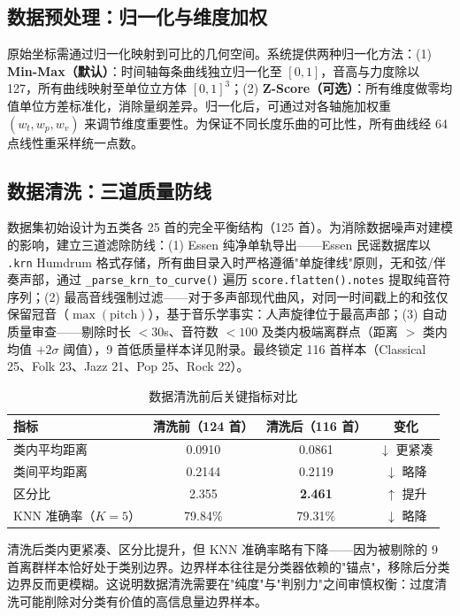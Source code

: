 \documentclass[withoutpreface]{cumcmthesis}
\begin{document}
\subsection{数据预处理：归一化与维度加权}

原始坐标需通过归一化映射到可比的几何空间。系统提供两种归一化方法：(1) \textbf{Min-Max（默认）}：时间轴每条曲线独立归一化至 $[0,1]$，音高与力度除以 127，所有曲线映射至单位立方体 $[0,1]^3$；(2) \textbf{Z-Score（可选）}：所有维度做零均值单位方差标准化，消除量纲差异。归一化后，可通过对各轴施加权重 $(w_t, w_p, w_v)$ 来调节维度重要性。为保证不同长度乐曲的可比性，所有曲线经 64 点线性重采样统一点数。

\subsection{数据清洗：三道质量防线}

数据集初始设计为五类各 25 首的完全平衡结构（125 首）。为消除数据噪声对建模的影响，建立三道滤除防线：(1) Essen 纯净单轨导出——Essen 民谣数据库以 \texttt{.krn} Humdrum 格式存储，所有曲目录入时严格遵循"单旋律线"原则，无和弦/伴奏声部，通过 \texttt{\_parse\_krn\_to\_curve()} 遍历 \texttt{score.flatten().notes} 提取纯音符序列；(2) 最高音线强制过滤——对于多声部现代曲风，对同一时间戳上的和弦仅保留冠音（$\max(\mathrm{pitch})$），基于音乐学事实：人声旋律位于最高声部；(3) 自动质量审查——剔除时长 $< 30$s、音符数 $< 100$ 及类内极端离群点（距离 $>$ 类内均值 $+ 2\sigma$ 阈值），9 首低质量样本详见附录。最终锁定 116 首样本（Classical 25、Folk 23、Jazz 21、Pop 25、Rock 22）。

\begin{table}[htbp]
    \centering
    \caption{数据清洗前后关键指标对比}
    \label{tab:cleaning}
    \begin{tabular}{lccc}
        \toprule
        \textbf{指标} & \textbf{清洗前（124 首）} & \textbf{清洗后（116 首）} & \textbf{变化} \\
        \midrule
        类内平均距离 & 0.0910 & 0.0861 & $\downarrow$ 更紧凑 \\
        类间平均距离 & 0.2144 & 0.2119 & $\downarrow$ 略降 \\
        区分比 & 2.355 & \textbf{2.461} & $\uparrow$ 提升 \\
        KNN 准确率（$K=5$） & 79.84\% & 79.31\% & $\downarrow$ 略降 \\
        \bottomrule
    \end{tabular}
\end{table}

清洗后类内更紧凑、区分比提升，但 KNN 准确率略有下降——因为被剔除的 9 首离群样本恰好处于类别边界。边界样本往往是分类器依赖的"锚点"，移除后分类边界反而更模糊。这说明数据清洗需要在"纯度"与"判别力"之间审慎权衡：过度清洗可能削除对分类有价值的高信息量边界样本。
\end{document}
